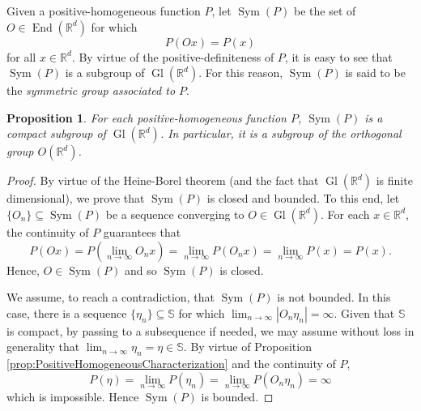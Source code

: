 \documentclass[11pt]{article}
\theoremstyle{theorem}
\newtheorem{proposition}[theorem]{Proposition}
\newcommand\End{\operatorname{End}} %
\newcommand\Gl{\operatorname{Gl}}                     %
\newcommand\Sym{\operatorname{Sym}}
\begin{document}
\noindent Given a positive-homogeneous function $P$, let $\Sym(P)$ be the set of $O\in\End(\mathbb{R}^d)$ for which
\begin{equation*}
P(Ox)=P(x)
\end{equation*}
for all $x\in\mathbb{R}^d$. By virtue of the positive-definiteness of $P$, it is easy to see that $\Sym(P)$ is a subgroup of $\Gl(\mathbb{R}^d)$. For this reason, $\Sym(P)$ is said to be the \textit{symmetric group associated to $P$}. 

\begin{proposition}\label{prop:SymCompact}
For each positive-homogeneous function $P$, $\Sym(P)$ is a compact subgroup of $\Gl(\mathbb{R}^d)$. In particular, it is a subgroup of the orthogonal group $O(\mathbb{R}^d)$.
\end{proposition}
\begin{proof}
By virtue of the Heine-Borel theorem (and the fact that $\Gl(\mathbb{R}^d)$ is finite dimensional), we prove that $\Sym(P)$ is closed and bounded. To this end, let $\{O_n\}\subseteq\Sym(P)$ be a sequence converging to $O\in \Gl(\mathbb{R}^d)$. For each $x\in\mathbb{R}^d$, the continuity of $P$ guarantees that
\begin{equation*}
P(Ox)=P\left(\lim_{n\to\infty}O_nx\right)=\lim_{n\to\infty}P(O_nx)=\lim_{n\to\infty}P(x)=P(x).
\end{equation*}
Hence, $O\in\Sym(P)$ and so $\Sym(P)$ is closed.

We assume, to reach a contradiction, that $\Sym(P)$ is not bounded. In this case, there is a sequence $\{\eta_n\}\subseteq \mathbb{S}$ for which $\lim_{n\to\infty}|O_n\eta_n|=\infty$. Given that $\mathbb{S}$ is compact, by passing to a subsequence if needed, we may assume without loss in generality that $\lim_{n\to\infty}\eta_n=\eta\in\mathbb{S}$. By virtue of Proposition \ref{prop:PositiveHomogeneousCharacterization} and the continuity of $P$,
\begin{equation*}
P(\eta)=\lim_{n\to\infty}P(\eta_n)=\lim_{n\to\infty}P(O_n\eta_n)=\infty
\end{equation*}
which is impossible. Hence $\Sym(P)$ is bounded.
\end{proof}
\end{document}
